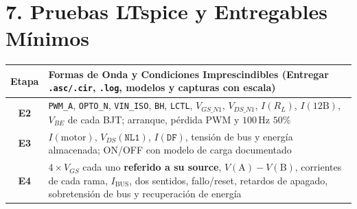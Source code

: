 \documentclass[10pt, a4paper, landscape]{article}
\begin{document}
\section*{7. Pruebas LTspice y Entregables Mínimos}

\par\vspace{0.04cm}
{\footnotesize
\renewcommand{\arraystretch}{1.15}%
\noindent\begin{tabularx}{\linewidth}{|c|>{\raggedright\arraybackslash}X|}
\hline
\rowcolor{ucbgray}
\textbf{Etapa} & \textbf{Formas de Onda y Condiciones Imprescindibles (Entregar \texttt{.asc/.cir}, \texttt{.log}, modelos y capturas con escala)} \\ \hline
\textbf{E2} & \texttt{PWM\_A}, \texttt{OPTO\_N}, \texttt{VIN\_ISO}, \texttt{BH}, \texttt{LCTL}, $V_{GS\_N1}$, $V_{DS\_N1}$, $I(R_L)$, $I(12\text{B})$, $V_{BE}$ de cada BJT; arranque, pérdida PWM y $100\,\text{Hz}$ $50\%$ \\ \hline
\textbf{E3} & $I(\text{motor})$, $V_{DS}(\texttt{NL1})$, $I(\texttt{DF})$, tensión de bus y energía almacenada; ON/OFF con modelo de carga documentado \\ \hline
\textbf{E4} & $4\times V_{GS}$ cada uno \textbf{referido a su source}, $V(\text{A})-V(\text{B})$, corrientes de cada rama, $I_{\text{BUS}}$, dos sentidos, fallo/reset, retardos de apagado, sobretensión de bus y recuperación de energía \\ \hline
\end{tabularx}\par}
\end{document}
